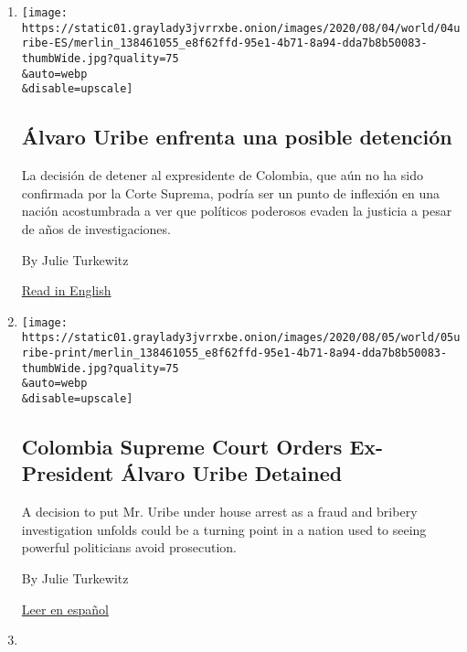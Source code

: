 \begin{enumerate}
\def\labelenumi{\arabic{enumi}.}
\item
  \href{/es/2020/08/04/espanol/america-latina/alvaro-uribe-detencion-colombia.html}{}

  \texttt{[image: https://static01.graylady3jvrrxbe.onion/images/2020/08/04/world/04uribe-ES/merlin\_138461055\_e8f62ffd-95e1-4b71-8a94-dda7b8b50083-thumbWide.jpg?quality=75\\\&auto=webp\\\&disable=upscale]}

  \hypertarget{uxe1lvaro-uribe-enfrenta-una-posible-detenciuxf3n}{%
  \subsection{Álvaro Uribe enfrenta una posible
  detención}\label{uxe1lvaro-uribe-enfrenta-una-posible-detenciuxf3n}}

  La decisión de detener al expresidente de Colombia, que aún no ha sido
  confirmada por la Corte Suprema, podría ser un punto de inflexión en
  una nación acostumbrada a ver que políticos poderosos evaden la
  justicia a pesar de años de investigaciones.

  By Julie Turkewitz

  \href{https://www.nytimes3xbfgragh.onion/2020/08/04/world/americas/colombia-president-uribe-charged.html}{Read
  in English}
\item
  \href{/2020/08/04/world/americas/colombia-president-uribe-charged.html}{}

  \texttt{[image: https://static01.graylady3jvrrxbe.onion/images/2020/08/05/world/05uribe-print/merlin\_138461055\_e8f62ffd-95e1-4b71-8a94-dda7b8b50083-thumbWide.jpg?quality=75\\\&auto=webp\\\&disable=upscale]}

  \hypertarget{colombia-supreme-court-orders-ex-president-uxe1lvaro-uribe-detained}{%
  \subsection{Colombia Supreme Court Orders Ex-President Álvaro Uribe
  Detained}\label{colombia-supreme-court-orders-ex-president-uxe1lvaro-uribe-detained}}

  A decision to put Mr. Uribe under house arrest as a fraud and bribery
  investigation unfolds could be a turning point in a nation used to
  seeing powerful politicians avoid prosecution.

  By Julie Turkewitz

  \href{https://www.nytimes3xbfgragh.onion/es/2020/08/04/espanol/america-latina/alvaro-uribe-detencion-colombia.html}{Leer
  en español}
\item
  \href{/interactive/2020/07/25/world/americas/coronavirus-brazil-amazon.html}{}


\end{enumerate}
